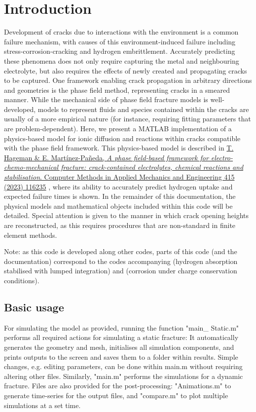 \documentclass[3p]{elsarticle} %
\newcommand{\citeMe}{\href{https://doi.org/10.1016/j.cma.2023.116235}{T. Hageman \& E. Martínez-Pañeda, \textit{A phase field-based framework for electro-chemo-mechanical fracture: crack-contained electrolytes, chemical reactions and stabilisation}. Computer Methods in Applied Mechanics and Engineering 415 (2023) 116235} \citep{Hageman2023}}
\begin{document}
\section{Introduction}
Development of cracks due to interactions with the environment is a common failure mechanism, with causes of this environment-induced failure including stress-corrosion-cracking and hydrogen embrittlement. Accurately predicting these phenomena does not only require capturing the metal and neighbouring electrolyte, but also requires the effects of newly created and propagating cracks to be captured. One framework enabling crack propagation in arbitrary directions and geometries is the phase field method, representing cracks in a smeared manner. While the mechanical side of phase field fracture models is well-developed, models to represent fluids and species contained within the cracks are usually of a more empirical nature (for instance, requiring fitting parameters that are problem-dependent). Here, we present a MATLAB implementation of a physics-based model for ionic diffusion and reactions within cracks compatible with the phase field framework. This physics-based model is described in \citeMe{}, where its ability to accurately predict hydrogen uptake and expected failure times is shown. In the remainder of this documentation, the physical models and mathematical objects included within this code will be detailed. Special attention is given to the manner in which crack opening heights are reconstructed, as this requires procedures that are non-standard in finite element methods.

Note: as this code is developed along other codes, parts of this code (and the documentation) correspond to the codes accompanying \citep{Hageman2023a} (hydrogen absorption stabilised with lumped integration) and \citep{Hageman2023b} (corrosion under charge conservation conditions).

\subsection{Basic usage}
For simulating the model as provided, running the function "main\_ Static.m" performs all required actions for simulating a static fracture: It automatically generates the geometry and mesh, initialises all simulation components, and prints outputs to the screen and saves them to a folder within results. Simple changes, e.g. editing parameters, can be done within main.m without requiring altering other files. Similarly, "main.m" performs the simulations for a dynamic fracture. Files are also provided for the post-processing: "Animations.m" to generate time-series for the output files, and "compare.m" to plot multiple simulations at a set time.
\end{document}
